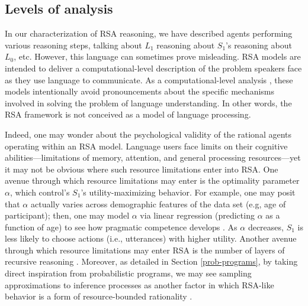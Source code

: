 \documentclass{sp}
\newcommand{\gcs}[1]{\textcolor{blue}{[gcs: #1]}}
\newcommand{\mf}[1]{\textcolor{orange}{[mf: #1]}}
\newcommand{\mht}[1]{\textcolor{purple}{[mht: #1]}}
\begin{document}



\subsection{Levels of analysis}


In our characterization of RSA reasoning, we have described agents performing various reasoning steps, talking about $L_1$ reasoning about $S_1$'s reasoning about $L_0$, etc. However, this language can sometimes prove misleading. RSA models are intended to deliver a computational-level description of the problem speakers face as they use language to communicate. As a computational-level analysis \citep{marr1982}, these models intentionally avoid pronouncements about the specific mechanisms involved in solving the problem of language understanding. In other words, the RSA framework is not conceived as a model of language processing.

Indeed, one may wonder about the psychological validity of the rational agents operating within an RSA model.
Language users face limits on their cognitive abilities---limitations of memory, attention, and general processing resources---yet it may not be obvious where such resource limitations enter into RSA.
One avenue through which resource limitations may enter is the optimality parameter $\alpha$, which control's $S_1$'s utility-maximizing behavior.
For example, one may posit that $\alpha$ actually varies across demographic features of the data set (e.g, age of participant); then, one may model $\alpha$ via linear regression (predicting $\alpha$ as a function of age) to see how pragmatic competence develops \citep{bohn2019predicting}.
As $\alpha$ decreases, $S_1$ is less likely to choose actions (i.e., utterances) with higher utility.
Another avenue through which resource limitations may enter RSA is the number of layers of recursive reasoning \citep{FrankeDegen2015:Reasoning-in-Re}.
Moreover, as detailed in Section \ref{prob-programs}, by taking direct inspiration from probabilistic programs, we may see sampling approximations to inference processes as another factor in which RSA-like behavior is a form of resource-bounded rationality \citep{GriffithsLieder2015:Rational-Use-of}.
\end{document}
